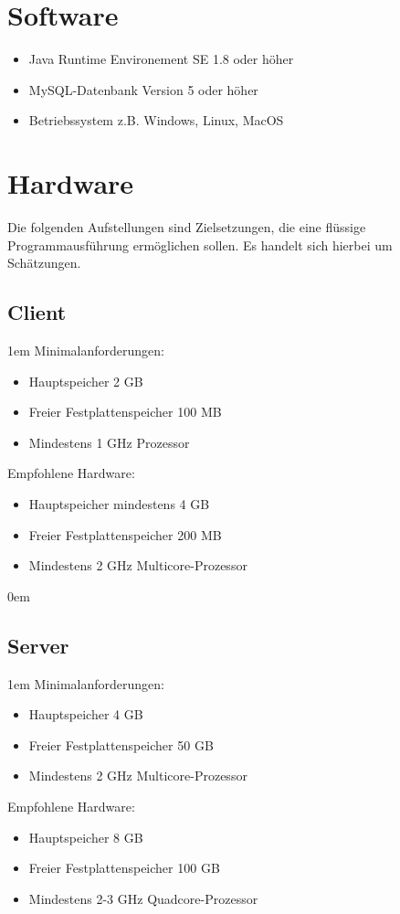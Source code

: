 \section{Software}
   \begin{itemize}
      \item Java Runtime Environement SE 1.8 oder höher
      \item MySQL-Datenbank Version 5 oder höher
      \item Betriebssystem z.B. Windows, Linux, MacOS
   \end{itemize}
\section{Hardware}
\label{sec:empfohleneHardware}
Die folgenden Aufstellungen sind Zielsetzungen, die eine flüssige Programmausführung ermöglichen sollen. Es handelt sich hierbei um Schätzungen.
	\subsection{Client}\label{subsec:hardwareClient}
	\leftskip1em
	Minimalanforderungen:
	\begin{itemize}
		\leftskip1em
		\item Hauptspeicher 2 GB
		\item Freier Festplattenspeicher 100 MB
		\item Mindestens 1 GHz Prozessor
	\end{itemize}
	Empfohlene Hardware:
	\begin{itemize}
		\leftskip1em
		\item Hauptspeicher mindestens 4 GB
		\item Freier Festplattenspeicher 200 MB
		\item Mindestens 2 GHz Multicore-Prozessor
	\end{itemize}
	\rightskip0em
   \subsection{Server}\label{subsec:hardwareServer}
   \leftskip1em
	Minimalanforderungen:
   \begin{itemize}
   	\leftskip1em
      \item Hauptspeicher 4 GB
      \item Freier Festplattenspeicher 50 GB
      \item Mindestens 2 GHz Multicore-Prozessor
   \end{itemize}
   Empfohlene Hardware:
   \begin{itemize}
   \leftskip1em
      \item Hauptspeicher 8 GB
      \item Freier Festplattenspeicher 100 GB
      \item Mindestens 2-3 GHz Quadcore-Prozessor
   \end{itemize}
   
